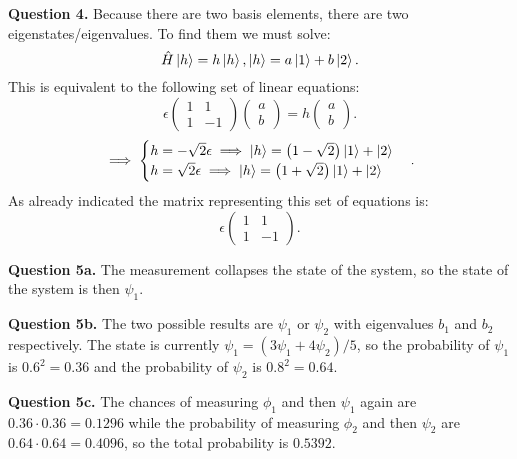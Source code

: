 \documentclass[letterpaper, reqno,11pt]{article}
\begin{document}
{\noindent\bf Question 4.} Because there are two basis elements, there are two eigenstates/eigenvalues. To find them we must solve: 
\[
\hat{H}\ket{h}=h\ket{h}, \ket h=a\ket 1+b\ket 2
.\]
This is equivalent to the following set of linear equations: 
\[
    \epsilon\begin{pmatrix} 1&1\\1&-1 \end{pmatrix}\begin{pmatrix} a\\b \end{pmatrix} =h\begin{pmatrix} a\\b \end{pmatrix} 
.\]
\[
\implies \begin{cases}
    h=-\sqrt{2}\epsilon \implies \ket h=\left( 1-\sqrt{2}  \right) \ket 1+\ket 2\\
    h=\sqrt{2}\epsilon \implies \ket h=\left( 1+\sqrt{2}  \right) \ket 1+\ket 2
\end{cases}
.\]
As already indicated the matrix representing this set of equations is: 
\[
\epsilon \begin{pmatrix} 1&1\\1&-1 \end{pmatrix}
.\]

{\noindent\bf Question 5a.} The measurement collapses the state of the system, so the state of the system is then $\psi_1$. 

 {\noindent\bf Question 5b.} The two possible results are $\psi_1$ or $\psi_2$ with eigenvalues $b_1$ and $b_2$ respectively. The state is currently $\psi_1=\left( 3\psi_1+4\psi_2 \right) /5 $, so the probability of $\psi_1$ is $0.6^2=0.36$ and the probability of $\psi_2$ is $0.8^2=0.64$. 

 {\noindent\bf Question 5c.} The chances of measuring $\phi_1$ and then $\psi_1$ again are $0.36\cdot 0.36=0.1296$ while the probability of measuring $\phi_2$ and then $\psi_2$ are $0.64\cdot 0.64=0.4096$, so the total probability is $0.5392$. 
\end{document}

